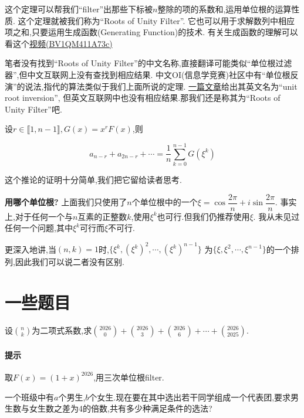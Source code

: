 \documentclass{article}
\begin{document}
这个定理可以帮我们``filter''出那些下标被$n$整除的项的系数和,运用单位根的运算性质.
这个定理就被我们称为``Roots of Unity Filter''.
它也可以用于求解数列中相应项之和,只要运用生成函数(Generating Function)的技术.
有关生成函数的理解可以看这个\href{https://www.bilibili.com/video/BV1QM411A73c/}{视频(BV1QM411A73c)}

笔者没有找到``Roots of Unity Filter''的中文名称,直接翻译可能类似``单位根过滤器'',但中文互联网上没有查找到相应结果.
中文OI(信息学竞赛)社区中有``单位根反演''的说法,指代的算法类似于我们上面所说的定理.
\href{https://notes.sshwy.name/Math/Unit-Root-Inversion/}{一篇文章}给出其英文名为``unit root inversion'',
但英文互联网中也没有相应结果.那我们还是称其为``Roots of Unity Filter''吧.

\begin{cor}
    设$r \in \llbracket 1, n - 1 \rrbracket, G(x) = x^rF(x)$,则

    \[ a_{n - r} + a_{2n - r} + \cdots = \frac{1}{n} \sum_{k=0}^{n-1} G(\xi^k) \]
\end{cor}

这个推论的证明十分简单,我们把它留给读者思考.

\begin{rqq}
    \textbf{用哪个单位根?} \quad 上面我们只使用了$n$个单位根中的一个$\xi = \cos \dfrac{2\pi}{n} + i \sin \dfrac{2\pi}{n}$.
    事实上,对于任何一个与$n$互素的正整数$k$,使用$\xi^k$也可行.但我们仍推荐使用$\xi$.
    我从未见过任何一个问题,其中$\xi^k$可行而$\xi$不可行.

    更深入地讲,当$(n, k) = 1$时,$\{ \xi^k, (\xi^k)^2, \cdots, (\xi^k)^{n - 1} \}$
    为$\{ \xi, \xi^2, \cdots, \xi^{n - 1} \}$的一个排列,因此我们可以说二者没有区别.
\end{rqq}

\section{一些题目}

\begin{exer}
    设$\binom{n}{k}$为二项式系数,求$\binom{2026}{0} + \binom{2026}{3} + \binom{2026}{6} + \cdots + \binom{2026}{2025}$.
\end{exer}

\paragraph{提示} 取$F(x) = (1 + x)^{2026}$,用三次单位根filter.

\begin{exer}
    一个班级中有$a$个男生,$b$个女生.现在要在其中选出若干同学组成一个代表团,要求男生数与女生数之差为4的倍数,共有多少种满足条件的选法?
\end{exer}
\end{document}
